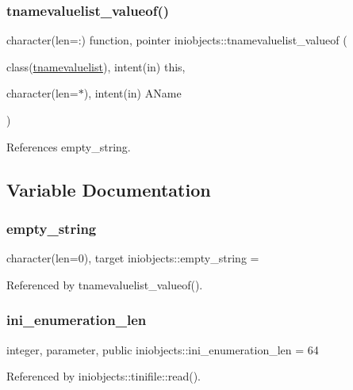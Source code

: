 \mbox{\label{namespaceiniobjects_a885480cca0257f187dfcd491a588ce52}} 
\subsubsection{\texorpdfstring{tnamevaluelist\+\_\+valueof()}{tnamevaluelist\_valueof()}}
{\footnotesize\ttfamily character(len=\+:) function, pointer iniobjects\+::tnamevaluelist\+\_\+valueof (\begin{DoxyParamCaption}\item[{class(\mbox{\hyperlink{structiniobjects_1_1tnamevaluelist}{tnamevaluelist}}), intent(in)}]{this,  }\item[{character(len=$\ast$), intent(in)}]{A\+Name }\end{DoxyParamCaption})\hspace{0.3cm}{\ttfamily [private]}}



References empty\+\_\+string.



\subsection{Variable Documentation}
\mbox{\label{namespaceiniobjects_a09461a87d61c35db5d0ad8895baae8dd}} 
\subsubsection{\texorpdfstring{empty\+\_\+string}{empty\_string}}
{\footnotesize\ttfamily character(len=0), target iniobjects\+::empty\+\_\+string = \textquotesingle{}\textquotesingle{}\hspace{0.3cm}{\ttfamily [private]}}



Referenced by tnamevaluelist\+\_\+valueof().

\mbox{\label{namespaceiniobjects_ad4e84129fd47c679fb1fcdd444d9fc84}} 
\subsubsection{\texorpdfstring{ini\+\_\+enumeration\+\_\+len}{ini\_enumeration\_len}}
{\footnotesize\ttfamily integer, parameter, public iniobjects\+::ini\+\_\+enumeration\+\_\+len = 64}



Referenced by iniobjects\+::tinifile\+::read().

